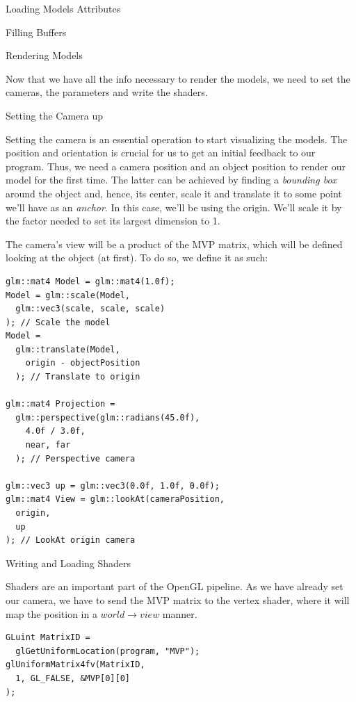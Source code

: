 \documentclass{article}
\begin{document}
\begin{multicols}{2}
\begin{section}{Loading Models Attributes}
\begin{subsection}{Filling Buffers}
  \end{subsection}
\end{section}

\begin{section}{Rendering Models}

  Now that we have all the info necessary to render the models, we need to set
the cameras, the parameters and write the shaders.

  \begin{subsection}{Setting the Camera up}
    \label{sec:set-camera}

    Setting the camera is an essential operation to start visualizing the
models. The position and orientation is crucial for us to get an initial
feedback to our program. Thus, we need a camera position and an object position
to render our model for the first time. The latter can be achieved by finding a
\textit{bounding box} around the object and, hence, its center, scale it and
translate it to some point we'll have as an \textit{anchor}. In this case, we'll
be using the origin. We'll scale it by the factor needed to set its largest
dimension to 1.

  The camera's view will be a product of the MVP matrix, which will be defined
looking at the object (at first). To do so, we define it as such:

  \begin{verbatim}
glm::mat4 Model = glm::mat4(1.0f);
Model = glm::scale(Model,
  glm::vec3(scale, scale, scale)
); // Scale the model
Model =
  glm::translate(Model,
    origin - objectPosition
  ); // Translate to origin

glm::mat4 Projection =
  glm::perspective(glm::radians(45.0f),
    4.0f / 3.0f,
    near, far
  ); // Perspective camera

glm::vec3 up = glm::vec3(0.0f, 1.0f, 0.0f);
glm::mat4 View = glm::lookAt(cameraPosition,
  origin,
  up
); // LookAt origin camera
  \end{verbatim}
    
  \end{subsection}

  \begin{subsection}{Writing and Loading Shaders}

    Shaders are an important part of the OpenGL pipeline. As we have already set
 our camera, we have to send the MVP matrix to the vertex shader, where it will
map the position in a $world \to view$ manner.

    \begin{verbatim}
GLuint MatrixID =
  glGetUniformLocation(program, "MVP");
glUniformMatrix4fv(MatrixID,
  1, GL_FALSE, &MVP[0][0]
);
    \end{verbatim}


\end{subsection}
\end{section}
\end{multicols}
\end{document}
